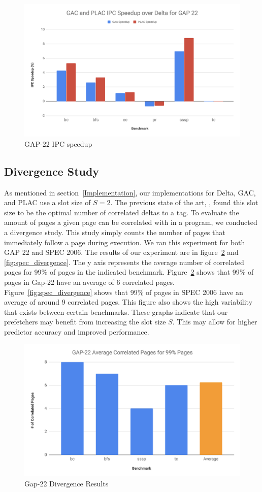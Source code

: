\documentclass[conference]{IEEEtran}
\begin{document}
    \begin{figure}[h]
        \centering
            \includegraphics[width=.85\textwidth]{gac_plac_gap22.png}
        \caption{GAP-22 IPC speedup}
        \label{fig:gac_plac_speedup}
    \end{figure}
    
    \subsection{Divergence Study}
        As mentioned in section~\ref{Implementation}, our implementations for Delta, GAC, and PLAC use a slot size of $S = 2$. The previous state of the art, \cite{c1}, found this slot size to be the optimal number of correlated deltas to a tag. To evaluate the amount of pages a given page can be correlated with in a program, we conducted a divergence study. This study simply counts the number of pages that immediately follow a page during execution. We ran this experiment for both GAP 22 and SPEC 2006. The results of our experiment are in figure~\ref{fig:g22_divergence} and \ref{fig:spec_divergence}. The y axis represents the average number of correlated pages for 99\% of pages in the indicated benchmark. Figure~\ref{fig:g22_divergence} shows that 99\% of pages in Gap-22 have an average of 6 correlated pages. Figure~\ref{fig:spec_divergence} shows that 99\% of pages in SPEC 2006 have an average of around 9 correlated pages. This figure also shows the high variability that exists between certain benchmarks. These graphs indicate that our prefetchers may benefit from increasing the slot size $S$. This may allow for higher predictor accuracy and improved performance.
        
        
    \begin{figure}[h]
        \centering
            \includegraphics[width=.5\textwidth]{gap22_divergence_avg.png}
        \caption{Gap-22 Divergence Results}
        \label{fig:g22_divergence}
    \end{figure}
    
\end{document}
